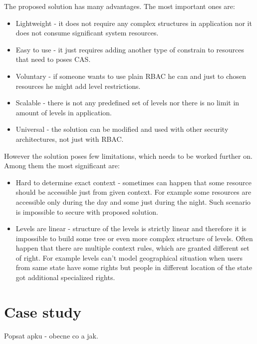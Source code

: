 \documentclass{sig-alternate}
\begin{document}
The proposed solution has many advantages. The most important ones are:

\begin{itemize}  
\setlength{\itemsep}{1pt}
	 \setlength{\parskip}{0pt}
  \setlength{\parsep}{0pt}
  \item Lightweight - it does not require any complex structures in application nor it does not consume significant system resources. 
  \item Easy to use - it just requires adding another type of constrain to resources that need to poses CAS.
  
  \item Voluntary - if someone wants to use plain RBAC he can and just to chosen resources he might add level restrictions. 
  
  \item Scalable - there is not any predefined set of levels nor there is no limit in amount of levels in application.
  
  \item Universal - the solution can be modified and used with other security architectures, not just with RBAC.
\end{itemize}

However the solution poses few limitations, which needs to be worked further on. Among them the most significant are:
\begin{itemize}
		\setlength{\itemsep}{1pt}
	 \setlength{\parskip}{0pt}
  \setlength{\parsep}{0pt}

  \item Hard to determine exact context - sometimes can happen that some resource should be accessible just from given context. For example some resources are accessible only during the day and some just during the night. Such scenario is impossible to secure with proposed solution.
  
  \item Levels are linear - structure of the levels is strictly linear and therefore it is impossible to build some tree or even more complex structure of levels. Often happen that there are multiple context rules, which are granted different set of right. For example levels can't model geographical situation when users from same state have some rights but people in different location of the state got additional specialized rights.
\end{itemize}

\section{Case study}
Popsat apku - obecne co a jak.
\end{document}
